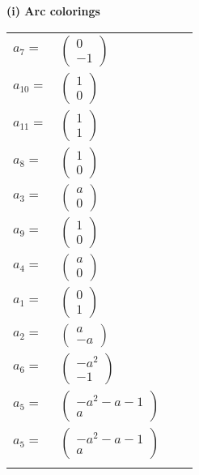 \documentclass[1p]{elsarticle_modified}
\theoremstyle{definition}
\begin{document}
\flushleft \textbf{(i) Arc colorings}\\
\begin{tabular}{m{7pt} m{180pt} m{7pt} m{180pt} }
\flushright $a_{7}=$&$\begin{pmatrix}0\\-1\end{pmatrix}$ \\
\flushright $a_{10}=$&$\begin{pmatrix}1\\0\end{pmatrix}$ \\
\flushright $a_{11}=$&$\begin{pmatrix}1\\1\end{pmatrix}$ \\
\flushright $a_{8}=$&$\begin{pmatrix}1\\0\end{pmatrix}$ \\
\flushright $a_{3}=$&$\begin{pmatrix}a\\0\end{pmatrix}$ \\
\flushright $a_{9}=$&$\begin{pmatrix}1\\0\end{pmatrix}$ \\
\flushright $a_{4}=$&$\begin{pmatrix}a\\0\end{pmatrix}$ \\
\flushright $a_{1}=$&$\begin{pmatrix}0\\1\end{pmatrix}$ \\
\flushright $a_{2}=$&$\begin{pmatrix}a\\- a\end{pmatrix}$ \\
\flushright $a_{6}=$&$\begin{pmatrix}- a^2\\-1\end{pmatrix}$ \\
\flushright $a_{5}=$&$\begin{pmatrix}- a^2- a-1\\a\end{pmatrix}$\\ \flushright $a_{5}=$&$\begin{pmatrix}- a^2- a-1\\a\end{pmatrix}$\\&\end{tabular}
\end{document}
